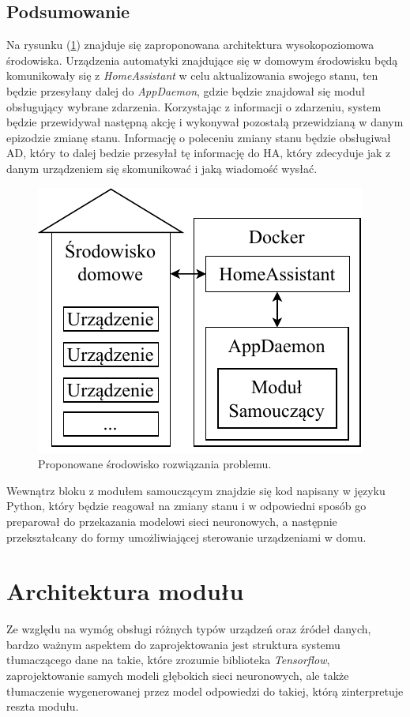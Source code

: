 \subsection{Podsumowanie}
Na rysunku (\ref{fig:architektura}) znajduje się zaproponowana architektura wysokopoziomowa środowiska. Urządzenia automatyki znajdujące się w domowym środowisku będą komunikowały się z \textit{HomeAssistant} w celu aktualizowania swojego stanu, ten będzie przesyłany dalej do \textit{AppDaemon}, gdzie będzie znajdował się moduł obsługujący wybrane zdarzenia. Korzystając z informacji o zdarzeniu, system będzie przewidywał następną akcję i wykonywał pozostałą przewidzianą w danym epizodzie zmianę stanu. Informację o poleceniu zmiany stanu będzie obsługiwał AD, który to dalej bedzie przesyłał tę informację do HA, który zdecyduje jak z danym urządzeniem się skomunikować i jaką wiadomość wysłać. 

\begin{figure}
    \centering\includegraphics[width=.45\textwidth]{img/architecture.pdf}
    \caption{Proponowane środowisko rozwiązania problemu.} \label{fig:architektura}
\end{figure}

Wewnątrz bloku z modułem samouczącym znajdzie się kod napisany w języku Python, który będzie reagował na zmiany stanu i w odpowiedni sposób go preparował do przekazania modelowi sieci neuronowych, a następnie przekształcany do formy umożliwiającej sterowanie urządzeniami w domu.

\section{Architektura modułu}
Ze względu na wymóg obsługi różnych typów urządzeń oraz źródeł danych, bardzo ważnym aspektem do zaprojektowania jest struktura systemu tłumaczącego dane na takie, które zrozumie biblioteka \textit{Tensorflow}, zaprojektowanie samych modeli głębokich sieci neuronowych, ale także tłumaczenie wygenerowanej przez model odpowiedzi do takiej, którą zinterpretuje reszta modułu.

